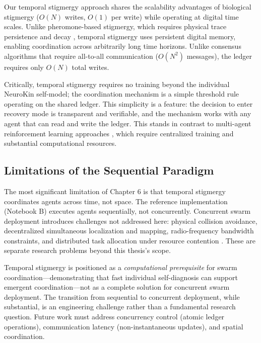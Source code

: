 \documentclass[12pt,a4paper,oneside]{report}
\begin{document}
Our temporal stigmergy approach shares the scalability advantages of biological stigmergy ($O(N)$ writes, $O(1)$ per write) while operating at digital time scales. Unlike pheromone-based stigmergy, which requires physical trace persistence and decay \cite{bongard2006resilient}, temporal stigmergy uses persistent digital memory, enabling coordination across arbitrarily long time horizons. Unlike consensus algorithms that require all-to-all communication ($O(N^2)$ messages), the ledger requires only $O(N)$ total writes.

Critically, temporal stigmergy requires no training beyond the individual NeuroKin self-model; the coordination mechanism is a simple threshold rule operating on the shared ledger. This simplicity is a feature: the decision to enter recovery mode is transparent and verifiable, and the mechanism works with any agent that can read and write the ledger. This stands in contrast to multi-agent reinforcement learning approaches \cite{domberg2026selfadapting, daneshmand2026slowrl}, which require centralized training and substantial computational resources.

\subsection{Limitations of the Sequential Paradigm}

The most significant limitation of Chapter 6 is that temporal stigmergy coordinates agents across time, not space. The reference implementation (Notebook B) executes agents sequentially, not concurrently. Concurrent swarm deployment introduces challenges not addressed here: physical collision avoidance, decentralized simultaneous localization and mapping, radio-frequency bandwidth constraints, and distributed task allocation under resource contention \cite{matsuki2024gaussian, keetha2024splattam}. These are separate research problems beyond this thesis's scope.

Temporal stigmergy is positioned as a \textit{computational prerequisite} for swarm coordination—demonstrating that fast individual self-diagnosis can support emergent coordination—not as a complete solution for concurrent swarm deployment. The transition from sequential to concurrent deployment, while substantial, is an engineering challenge rather than a fundamental research question. Future work must address concurrency control (atomic ledger operations), communication latency (non-instantaneous updates), and spatial coordination. 
\end{document}
